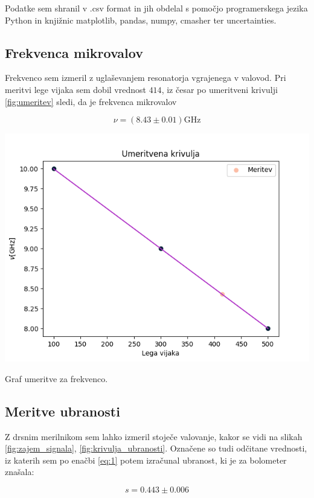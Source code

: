\documentclass[11pt]{article}
\begin{document}
Podatke sem shranil v .csv format in jih obdelal s pomočjo programerskega
jezika Python in knjižnic matplotlib, pandas, numpy, cmasher ter
uncertainties.
\subsection{Frekvenca mikrovalov}\label{sec:orgb9f4d6a}

Frekvenco sem izmeril z uglaševanjem resonatorja vgrajenega v valovod. Pri
meritvi lege vijaka sem dobil vrednost \(414\), iz česar po umeritveni
krivulji \ref{fig:umeritev} sledi, da je frekvenca mikrovalov

\[ \nu = (8.43 \pm 0.01) \mathrm{GHz}
\]

\begin{slika}[H]
\begin{center}
\includegraphics[width=.9\linewidth]{figures/umeritev.png}
\end{center}
\caption{\small Graf umeritve za frekvenco. }\label{fig:umeritev}
\end{slika}


\subsection{Meritve ubranosti}\label{sec:org4464617}

Z drsnim merilnikom sem lahko izmeril stoječe valovanje, kakor se vidi na
slikah \ref{fig:zajem_signala}, \ref{fig:krivulja_ubranosti}. Označene so tudi
odčitane vrednosti, iz
katerih sem po enačbi \ref{eq:1} potem izračunal ubranost, ki je za bolometer
znašala:

\[s = 0.443 \pm 0.006
\]
\end{document}

